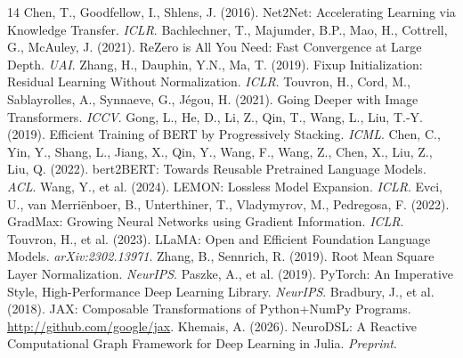 \documentclass[11pt,a4paper]{article}
\begin{document}
\begin{thebibliography}{14}
 Chen, T., Goodfellow, I., Shlens, J. (2016). Net2Net: Accelerating Learning via Knowledge Transfer. \emph{ICLR}.
 Bachlechner, T., Majumder, B.P., Mao, H., Cottrell, G., McAuley, J. (2021). ReZero is All You Need: Fast Convergence at Large Depth. \emph{UAI}.
 Zhang, H., Dauphin, Y.N., Ma, T. (2019). Fixup Initialization: Residual Learning Without Normalization. \emph{ICLR}.
 Touvron, H., Cord, M., Sablayrolles, A., Synnaeve, G., J\'egou, H. (2021). Going Deeper with Image Transformers. \emph{ICCV}.
 Gong, L., He, D., Li, Z., Qin, T., Wang, L., Liu, T.-Y. (2019). Efficient Training of BERT by Progressively Stacking. \emph{ICML}.
 Chen, C., Yin, Y., Shang, L., Jiang, X., Qin, Y., Wang, F., Wang, Z., Chen, X., Liu, Z., Liu, Q. (2022). bert2BERT: Towards Reusable Pretrained Language Models. \emph{ACL}.
 Wang, Y., et al. (2024). LEMON: Lossless Model Expansion. \emph{ICLR}.
 Evci, U., van Merri\"enboer, B., Unterthiner, T., Vladymyrov, M., Pedregosa, F. (2022). GradMax: Growing Neural Networks using Gradient Information. \emph{ICLR}.
 Touvron, H., et al. (2023). LLaMA: Open and Efficient Foundation Language Models. \emph{arXiv:2302.13971}.
 Zhang, B., Sennrich, R. (2019). Root Mean Square Layer Normalization. \emph{NeurIPS}.
 Paszke, A., et al. (2019). PyTorch: An Imperative Style, High-Performance Deep Learning Library. \emph{NeurIPS}.
 Bradbury, J., et al. (2018). JAX: Composable Transformations of Python+NumPy Programs. \url{http://github.com/google/jax}.
 Khemais, A. (2026). NeuroDSL: A Reactive Computational Graph Framework for Deep Learning in Julia. \emph{Preprint}.
\end{thebibliography}
\end{document}
